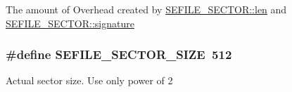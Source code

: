 The amount of Overhead created by \hyperlink{struct_s_e_f_i_l_e___s_e_c_t_o_r_a7a0bf13d497fbcd2a5ac99511209bff0}{S\-E\-F\-I\-L\-E\-\_\-\-S\-E\-C\-T\-O\-R\-::len} and \hyperlink{struct_s_e_f_i_l_e___s_e_c_t_o_r_a111b909efca8a7c55f22c621c81e4cb5}{S\-E\-F\-I\-L\-E\-\_\-\-S\-E\-C\-T\-O\-R\-::signature} \hypertarget{group___sector___defines_gad205a758c315675de3ad9f5f1cbf962d}{
\subsubsection[{S\-E\-F\-I\-L\-E\-\_\-\-S\-E\-C\-T\-O\-R\-\_\-\-S\-I\-Z\-E}]{\setlength{\rightskip}{0pt plus 5cm}\#define S\-E\-F\-I\-L\-E\-\_\-\-S\-E\-C\-T\-O\-R\-\_\-\-S\-I\-Z\-E~512}}\label{group___sector___defines_gad205a758c315675de3ad9f5f1cbf962d}
Actual sector size. Use only power of 2 